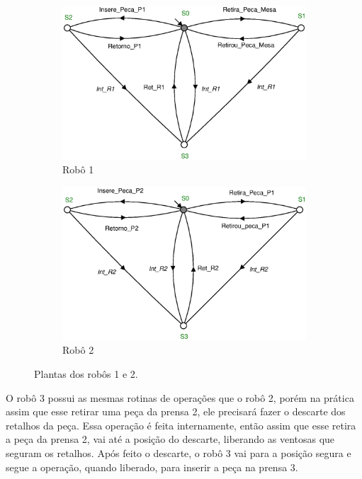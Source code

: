 \begin{figure}[H]%
	\centering
	\begin{subfigure}[b]{0.45\textwidth}
		\centering
		\includegraphics[width=\textwidth]{imagens/Robo_1.eps}
		\caption{Robô 1}
		\label{fig:robo1}
	\end{subfigure}
	\hfill
	\begin{subfigure}[b]{0.45\textwidth}
		\centering
		\includegraphics[width=\textwidth]{imagens/Robo_2.eps}
		\caption{Robô 2}
		\label{fig:robo2}
	\end{subfigure}
	\caption{Plantas dos robôs 1 e 2.}
	\label{fig:robo12}
\end{figure}

O robô 3 possui as mesmas rotinas de operações que o robô 2, porém na prática assim que esse retirar uma peça da prensa 2, ele precisará fazer o descarte dos retalhos da peça. Essa operação é feita internamente, então assim que esse retira a peça da prensa 2, vai até a posição do descarte, liberando as ventosas que seguram os retalhos. Após feito o descarte, o robô 3 vai para a posição segura e segue a operação, quando liberado, para inserir a peça na prensa 3. 

